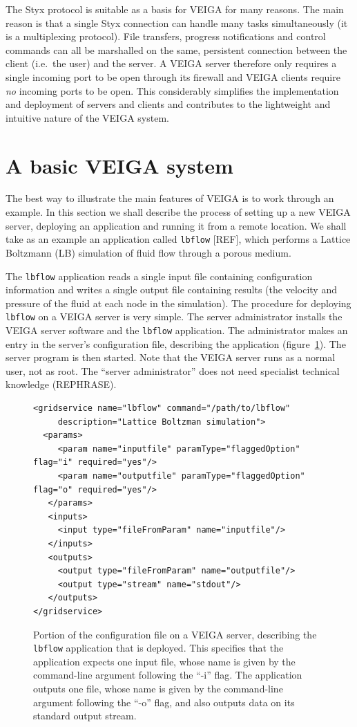 \documentclass[a4paper]{article}
\begin{document}
\begin{multicols}{2}
The Styx protocol is suitable as a basis for VEIGA for many reasons.  The main reason is that a single Styx connection can handle many tasks simultaneously (it is a multiplexing protocol).  File transfers, progress notifications and control commands can all be marshalled on the same, persistent connection between the client (i.e.\ the user) and the server.  A VEIGA server therefore only requires a single incoming port to be open through its firewall and VEIGA clients require {\em no\/} incoming ports to be open.  This considerably simplifies the implementation and deployment of servers and clients and contributes to the lightweight and intuitive nature of the VEIGA system.


\section{A basic VEIGA system}\label{sec:basicveiga}
The best way to illustrate the main features of VEIGA is to work through an example.  In this section we shall describe the process of setting up a new VEIGA server, deploying an application and running it from a remote location.  We shall take as an example an application called {\tt lbflow} [REF], which performs a Lattice Boltzmann (LB) simulation of fluid flow through a porous medium.

The {\tt lbflow} application reads a single input file containing configuration information and writes a single output file containing results (the velocity and pressure of the fluid at each node in the simulation).  The procedure for deploying {\tt lbflow} on a VEIGA server is very simple.  The server administrator installs the VEIGA server software and the {\tt lbflow} application.  The administrator makes an entry in the server's configuration file, describing the application (figure~\ref{fig:lbflowconfig}).  The server program is then started.  Note that the VEIGA server runs as a normal user, not as root.  The ``server administrator'' does not need specialist technical knowledge (REPHRASE).

\begin{figure}
\centering
\begin{verbatim}
<gridservice name="lbflow" command="/path/to/lbflow"
     description="Lattice Boltzman simulation">
  <params>
     <param name="inputfile" paramType="flaggedOption" flag="i" required="yes"/>
     <param name="outputfile" paramType="flaggedOption" flag="o" required="yes"/>
   </params>
   <inputs>
     <input type="fileFromParam" name="inputfile"/>
   </inputs>
   <outputs>
     <output type="fileFromParam" name="outputfile"/>
     <output type="stream" name="stdout"/>
   </outputs>
</gridservice>
\end{verbatim}
\caption{Portion of the configuration file on a VEIGA server, describing the {\tt lbflow} application that is deployed.  This specifies that the application expects one input file, whose name is given by the command-line argument following the ``-i'' flag.  The application outputs one file, whose name is given by the command-line argument following the ``-o'' flag, and also outputs data on its standard output stream.}
\label{fig:lbflowconfig}
\end{figure}


\end{multicols}
\end{document}
